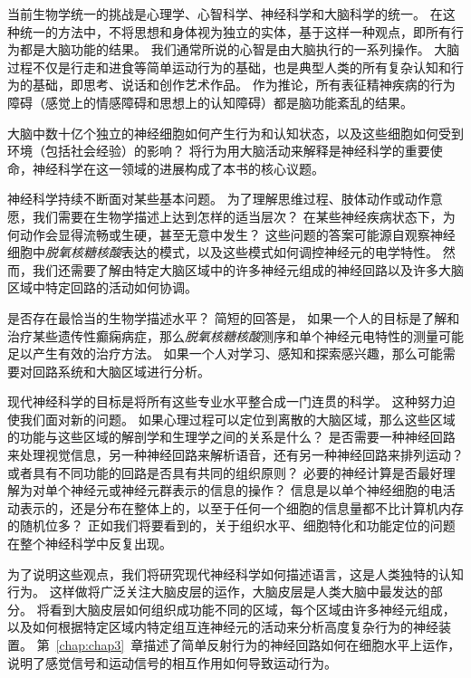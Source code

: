 当前生物学统一的挑战是心理学、心智科学、神经科学和大脑科学的统一。 
在这种统一的方法中，不将思想和身体视为独立的实体，基于这样一种观点，即所有行为都是大脑功能的结果。 
我们通常所说的心智是由大脑执行的一系列操作。 
大脑过程不仅是行走和进食等简单运动行为的基础，也是典型人类的所有复杂认知和行为的基础，即思考、说话和创作艺术作品。 
作为推论，所有表征精神疾病的行为障碍（感觉上的情感障碍和思想上的认知障碍）都是脑功能紊乱的结果。


大脑中数十亿个独立的神经细胞如何产生行为和认知状态，以及这些细胞如何受到环境（包括社会经验）的影响？ 
将行为用大脑活动来解释是神经科学的重要使命，神经科学在这一领域的进展构成了本书的核心议题。


神经科学持续不断面对某些基本问题。 
为了理解思维过程、肢体动作或动作意愿，我们需要在生物学描述上达到怎样的适当层次？ 
在某些神经疾病状态下，为何动作会显得流畅或生硬，甚至无意中发生？ 
这些问题的答案可能源自观察神经细胞中\textit{脱氧核糖核酸}表达的模式，以及这些模式如何调控神经元的电学特性。
然而，我们还需要了解由特定大脑区域中的许多神经元组成的神经回路以及许多大脑区域中特定回路的活动如何协调。


是否存在最恰当的生物学描述水平？
简短的回答是，
如果一个人的目标是了解和治疗某些遗传性癫痫病症，那么\textit{脱氧核糖核酸}测序和单个神经元电特性的测量可能足以产生有效的治疗方法。
如果一个人对学习、感知和探索感兴趣，那么可能需要对回路系统和大脑区域进行分析。


现代神经科学的目标是将所有这些专业水平整合成一门连贯的科学。
这种努力迫使我们面对新的问题。
如果心理过程可以定位到离散的大脑区域，那么这些区域的功能与这些区域的解剖学和生理学之间的关系是什么？ 
是否需要一种神经回路来处理视觉信息，另一种神经回路来解析语音，还有另一种神经回路来排列运动？
或者具有不同功能的回路是否具有共同的组织原则？
必要的神经计算是否最好理解为对单个神经元或神经元群表示的信息的操作？
信息是以单个神经细胞的电活动表示的，还是分布在整体上的，以至于任何一个细胞的信息量都不比计算机内存的随机位多？
正如我们将要看到的，关于组织水平、细胞特化和功能定位的问题在整个神经科学中反复出现。


为了说明这些观点，我们将研究现代神经科学如何描述语言，这是人类独特的认知行为。
这样做将广泛关注大脑皮层的运作，大脑皮层是人类大脑中最发达的部分。
将看到大脑皮层如何组织成功能不同的区域，每个区域由许多神经元组成，以及如何根据特定区域内特定组互连神经元的活动来分析高度复杂行为的神经装置。
第~\ref{chap:chap3}~章描述了简单反射行为的神经回路如何在细胞水平上运作，说明了感觉信号和运动信号的相互作用如何导致运动行为。




